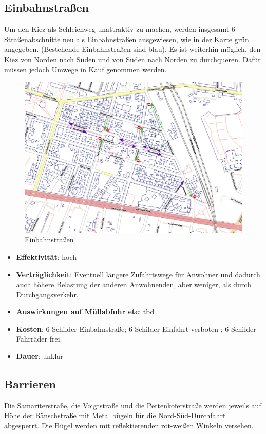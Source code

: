 \documentclass[a4paper,10pt]{scrartcl}
\begin{document}
\subsection{Einbahnstraßen}
Um den Kiez als Schleichweg unattraktiv zu machen, werden insgesamt 6 Straßenabschnitte neu als Einbahnstraßen ausgewiesen, wie in der Karte grün angegeben. (Bestehende Einbahnstraßen sind blau). Es ist weiterhin möglich, den Kiez von Norden nach Süden und von Süden nach Norden zu durchqueren. Dafür müssen jedoch Umwege in Kauf genommen werden. 

\begin{figure}[h]
\includegraphics[width=\textwidth]{einbahnstrassen.png}
\caption{Einbahnstraßen}
\end{figure}

  
\begin{itemize}
 \item \textbf{Effektivität}: hoch
 \item \textbf{Verträglichkeit}: Eventuell längere Zufahrtswege für Anwohner und dadurch auch höhere Belastung der anderen Anwohnenden, aber weniger, als durch Durchgangsverkehr. 
 \item \textbf{Auswirkungen auf Müllabfuhr etc}: tbd
 \item \textbf{Kosten}: 6 Schilder {\glqq}Einbahnstraße{\grqq}; 6 Schilder  {\glqq}Einfahrt verboten{\grqq}	; 6 Schilder  {\glqq}Fahrräder frei{\grqq}. 
 \item \textbf{Dauer}: unklar  
\end{itemize}
\newpage
\subsection{Barrieren}
Die Samariterstraße, die Voigtstraße und die Pettenkoferstraße werden jeweils auf Höhe der Bänschstraße mit Metallbügeln für die Nord-Süd-Durchfahrt abgesperrt. Die Bügel werden mit reflektierenden rot-weißen Winkeln versehen. 
\end{document}
